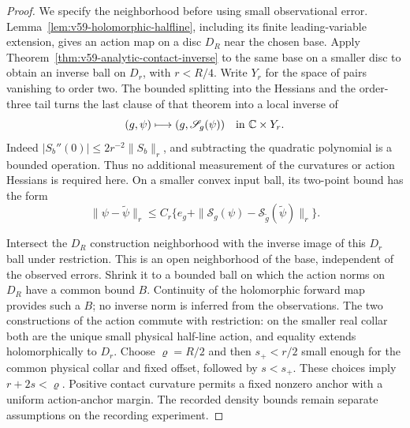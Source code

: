 \begin{proof}
We specify the neighborhood before using small observational error.
Lemma~\ref{lem:v59-holomorphic-halfline}, including its finite
leading-variable extension, gives an action map on a disc $D_R$ near
the chosen base.  Apply
Theorem~\ref{thm:v59-analytic-contact-inverse} to the same base on a
smaller disc to obtain an inverse ball on $D_r$, with $r<R/4$.
Write $Y_r$ for the space of pairs vanishing to order two.  The bounded
splitting into the Hessians and the order-three tail turns the last
clause of that theorem into a local inverse of
\[
       (g,\psi)\longmapsto(g,\mathscr S_g(\psi))
                       \quad\hbox{in }\mathbb C\times Y_r.
\]
Indeed $|S_b''(0)|\le2r^{-2}\|S_b\|_r$, and subtracting the
quadratic polynomial is a bounded operation.  Thus no additional
measurement of the curvatures or action Hessians is required here.
On a smaller convex input ball, its two-point bound has the form
\begin{equation}\label{eq:v60-joint-inner-inverse}
 \|\psi-\widetilde\psi\|_r
       \le C_r\{e_g+\|\mathscr S_g(\psi)
                   -\mathscr S_{\widetilde g}(\widetilde\psi)\|_r\}.
\end{equation}

Intersect the $D_R$ construction neighborhood with the inverse image
of this $D_r$ ball under restriction.  This is an open neighborhood of
the base, independent of the observed errors.  Shrink it to a bounded
ball on which the action norms on $D_R$ have a common bound $B$.
Continuity of the holomorphic forward map provides such a $B$; no
inverse norm is inferred from the observations.  The two constructions
of the action commute with restriction: on the smaller real collar
both are the unique small physical half-line action, and equality
extends holomorphically to $D_r$.  Choose
$\varrho=R/2$ and then $s_+<r/2$ small enough for the common physical
collar and fixed offset, followed by $s<s_+$.  These choices imply
$r+2s<\varrho$.  Positive contact curvature permits a fixed nonzero
anchor with a uniform action-anchor margin.  The recorded density
bounds remain separate assumptions on the recording experiment.


\end{proof}
